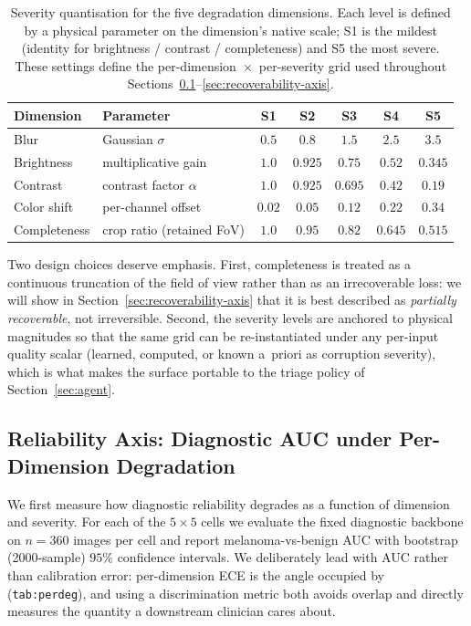 \begin{table}[t]
\centering
\caption{Severity quantisation for the five degradation dimensions. Each level is defined by a physical parameter on the dimension's native scale; S1 is the mildest (identity for brightness / contrast / completeness) and S5 the most severe. These settings define the per-dimension~$\times$~per-severity grid used throughout Sections~\ref{sec:reliability-axis}--\ref{sec:recoverability-axis}.}
\label{tab:c0-severity}
\small
\begin{tabular}{llccccc}
\toprule
Dimension & Parameter & S1 & S2 & S3 & S4 & S5 \\
\midrule
Blur         & Gaussian $\sigma$            & $0.5$  & $0.8$   & $1.5$   & $2.5$   & $3.5$  \\
Brightness   & multiplicative gain          & $1.0$  & $0.925$ & $0.75$  & $0.52$  & $0.345$ \\
Contrast     & contrast factor $\alpha$     & $1.0$  & $0.925$ & $0.695$ & $0.42$  & $0.19$ \\
Color shift  & per-channel offset           & $0.02$ & $0.05$  & $0.12$  & $0.22$  & $0.34$ \\
Completeness & crop ratio (retained FoV)    & $1.0$  & $0.95$  & $0.82$  & $0.645$ & $0.515$ \\
\bottomrule
\end{tabular}
\end{table}

Two design choices deserve emphasis. First, completeness is treated as a continuous truncation of the field of view rather than as an irrecoverable loss: we will show in Section~\ref{sec:recoverability-axis} that it is best described as \emph{partially recoverable}, not irreversible. Second, the severity levels are anchored to physical magnitudes so that the same grid can be re-instantiated under any per-input quality scalar (learned, computed, or known a~priori as corruption severity), which is what makes the surface portable to the triage policy of Section~\ref{sec:agent}.

\subsection{Reliability Axis: Diagnostic AUC under Per-Dimension Degradation}
\label{sec:reliability-axis}

We first measure how diagnostic reliability degrades as a function of dimension and severity. For each of the $5\times5$ cells we evaluate the fixed diagnostic backbone on $n=360$ images per cell and report melanoma-vs-benign AUC with bootstrap (2000-sample) $95\%$ confidence intervals. We deliberately lead with AUC rather than calibration error: per-dimension ECE is the angle occupied by \citet{ANON-BMVC} (\texttt{tab:perdeg}), and using a discrimination metric both avoids overlap and directly measures the quantity a downstream clinician cares about.

